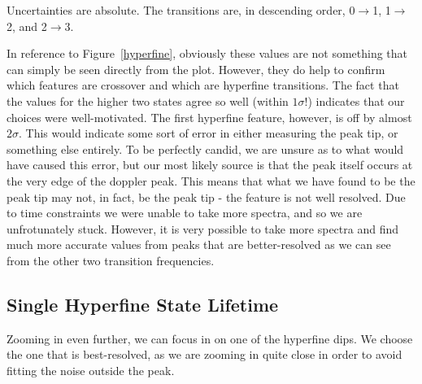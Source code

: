\documentclass{article}
\begin{document}
  \begin{table}[!htb]
  	\centering
    \caption{Uncertainties are absolute.  The transitions are, in descending order, 0$\rightarrow$1, 1$\rightarrow$2, and 2$\rightarrow$3.}
    \label{hyperfine_splitting}
  \end{table}

  In reference to Figure~\ref{hyperfine}, obviously these values are not something that can simply be seen directly from the plot.  However, they do help to confirm which features are crossover and which are hyperfine transitions.  The fact that the values for the higher two states agree so well (within $1\sigma$!) indicates that our choices were well-motivated.  The first hyperfine feature, however, is off by almost $2\sigma$.  This would indicate some sort of error in either measuring the peak tip, or something else entirely.  To be perfectly candid, we are unsure as to what would have caused this error, but our most likely source is that the peak itself occurs at the very edge of the doppler peak.  This means that what we have found to be the peak tip may not, in fact, be the peak tip - the feature is not well resolved.  Due to time constraints we were unable to take more spectra, and so we are unfrotunately stuck.  However, it is very possible to take more spectra and find much more accurate values  from peaks that are better-resolved as we can see from the other two transition frequencies.

  \subsection{Single Hyperfine State Lifetime}
  Zooming in even further, we can focus in on one of the hyperfine dips.  We choose the one that is best-resolved, as we are zooming in quite close in order to avoid fitting the noise outside the peak.

  \hspace{.25cm}
\end{document}
